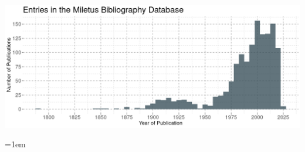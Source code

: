 \documentclass[a4paper,openany]{scrbook}
\begin{document}


\clearpage

\begin{multicols}{2}
    \tableofcontents
\end{multicols}
\clearpage



\vfill
\includegraphics[width=\textwidth]{../out/figures/mil-pubs-by-year.png}


\begin{flushleft}%
\clearpage 

\setlength{\parskip}{6pt}
\hangindent=1em



\end{flushleft}
\end{document}
